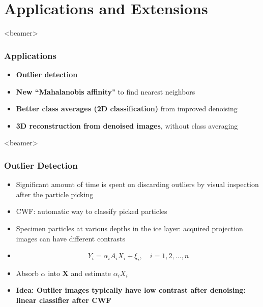 \documentclass{beamer}
\begin{document}
\section{Applications and Extensions}
\begin{frame}<beamer>
\frametitle{Applications}
\begin{itemize}
\item \textbf{Outlier detection }
\item \textbf{New ``Mahalanobis affinity"} to find nearest neighbors
 \item \textbf{Better class averages (2D classification)} from improved denoising
 \item \textbf{3D reconstruction from denoised images}, without class averaging
\end{itemize}
\end{frame}



\begin{frame}<beamer>
\frametitle{Outlier Detection}
\begin{itemize}
 \item  Significant amount of time is spent on discarding outliers by visual inspection
after the particle picking 
\item CWF:  automatic way to classify picked particles
\item Specimen particles at various depths in the ice layer: acquired
projection images can have different contrasts
\item 
\begin{equation}
 Y_i = \alpha_i A_i X_i + \xi_i, \quad i=1,2,\ldots,n
\label{eqn:contrast}
\end{equation}
\item Absorb $\alpha$ into $\textbf{X}$ and estimate $\alpha_i X_i$ 
\item  \textbf{Idea: Outlier images typically have low contrast
after denoising: linear classifier after CWF }
\end{itemize}
\end{frame}
\end{document}
